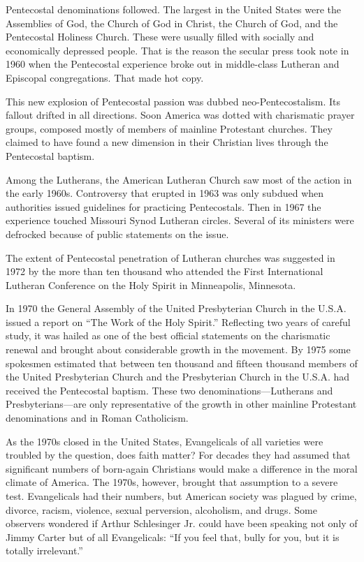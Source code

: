 Pentecostal denominations followed. The largest in the United States were the Assemblies of God, the
Church of God in Christ, the Church of God, and the Pentecostal Holiness Church. These were usually
filled with socially and economically depressed people. That is the reason the secular press took
note in 1960 when the Pentecostal experience broke out in middle-class Lutheran and Episcopal
congregations. That made hot copy.

This new explosion of Pentecostal passion was dubbed neo-Pentecostalism. Its fallout drifted in all
directions. Soon America was dotted with charismatic prayer groups, composed mostly of members of
mainline Protestant churches. They claimed to have found a new dimension in their Christian lives
through the Pentecostal baptism.

Among the Lutherans, the American Lutheran Church saw most of the action in the early 1960s.
Controversy that erupted in 1963 was only subdued when authorities issued guidelines for practicing
Pentecostals. Then in 1967 the experience touched Missouri Synod Lutheran circles. Several of its
ministers were defrocked because of public statements on the issue.

The extent of Pentecostal penetration of Lutheran churches was suggested in 1972 by the more than
ten thousand who attended the First International Lutheran Conference on the Holy Spirit in
Minneapolis, Minnesota.

In 1970 the General Assembly of the United Presbyterian Church in the U.S.A. issued a report on “The
Work of the Holy Spirit.” Reflecting two years of careful study, it was hailed as one of the best
official statements on the charismatic renewal and brought about considerable growth in the
movement. By 1975 some spokesmen estimated that between ten thousand and fifteen thousand members of
the United Presbyterian Church and the Presbyterian Church in the U.S.A. had received the
Pentecostal baptism. These two denominations—Lutherans and Presbyterians—are only representative of
the growth in other mainline Protestant denominations and in Roman Catholicism.

As the 1970s closed in the United States, Evangelicals of all varieties were troubled by the
question, does faith matter? For decades they had assumed that significant numbers of born-again
Christians would make a difference in the moral climate of America. The 1970s, however, brought that
assumption to a severe test. Evangelicals had their numbers, but American society was plagued by
crime, divorce, racism, violence, sexual perversion, alcoholism, and drugs. Some observers wondered
if Arthur Schlesinger Jr. could have been speaking not only of Jimmy Carter but of all Evangelicals:
“If you feel that, bully for you, but it is totally irrelevant.”

